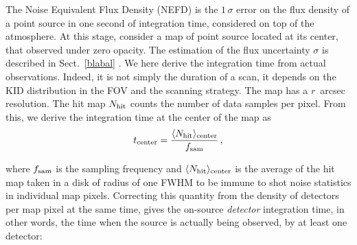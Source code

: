 The Noise Equivalent Flux Density (NEFD) is the $1\,\sigma$ error on the flux
density of a point source in one second of integration time, considered on top
of the atmosphere. At this stage, consider a map of point source located at its
center, that observed under zero opacity. The estimation of the flux uncertainty
$\sigma$ is described in Sect.~\ref{blabal} . We here derive the integration time from
actual observations. Indeed, it is not simply the duration of a scan, it depends
on the KID distribution in the FOV and the scanning strategy. The map has a
$r$~arcsec resolution. The hit map $N_{\rm{hit}}$ counts the number of data
samples per pixel. From this, we derive the integration time at the center of
the map as
%
%
\begin{equation}
t_{\rm{center}} = \frac{\langle N_{\rm{hit}}\rangle_{\rm{center}}}{f_{\rm{sam}}}\,,
\end{equation}

where $f_{\rm{sam}}$ is the sampling frequency and $\langle
N_{\rm{hit}}\rangle_{\rm{center}}$ is the average of the hit map taken in a disk
of radius of one FWHM to be immune to shot noise statistics in individual map
pixels. Correcting this quantity from the density of detectors per map pixel at
the same time, gives the on-source \emph{detector} integration time, in other
words, the time when the source is actually being observed, by at least one
detector:

